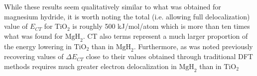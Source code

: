 \documentclass[aps,prb,twocolumn,amsmath,amssymb,superscriptaddress,longbibliography]{revtex4-1}
\newcommand{\N}{\mathbb{N}}
\newcommand{\C}{\mathbb{C}}
\begin{document}
While these results seem qualitatively similar to what was obtained for magnesium hydride, it is worth noting the total (i.e. allowing full delocalization) value of $E_{CT}$ for $\text{TiO}_{2}$ is roughly 500 kJ/mol/atom which is more than ten times what was found for $\text{MgH}_{2}$.
CT also terms represent a much larger proportion of the energy lowering in $\text{TiO}_{2}$ than in $\text{MgH}_{2}$.
Furthermore, as was noted previously recovering values of $\Delta E_{CT}$ close to their values obtained through traditional DFT methods requires much greater electron delocalization in $\text{MgH}_{2}$ than in $\text{TiO}_{2}$
  


















\end{document}
